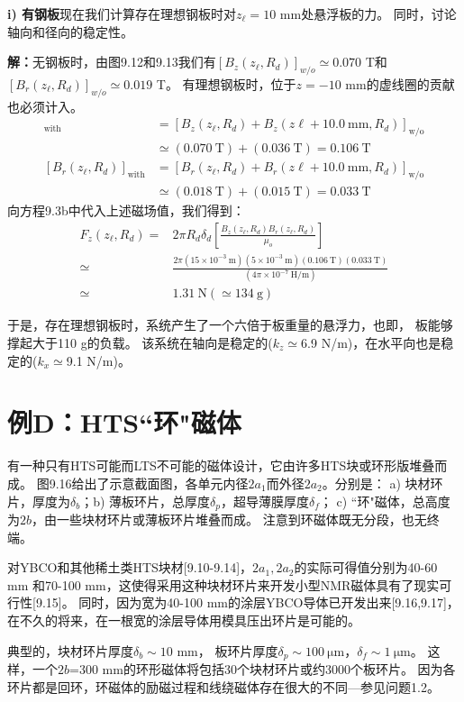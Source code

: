 \textbf{i) 有钢板}\qquad 现在我们计算存在理想钢板时对$z_\ell=10$ mm处悬浮板的力。
同时，讨论轴向和径向的稳定性。

\textbf{解：}无钢板时，由图9.12和9.13我们有$[B_z(z_\ell,R_d)]_{w/o}\simeq 0.070$ T和
$[B_r(z_\ell,R_d)]_{w/o}\simeq 0.019$ T。
有理想钢板时，位于$z=-10$ mm的虚线圈的贡献也必须计入。
\begin{align*}%
[B_z(z_\ell,R_d)]_{\mathrm{with}}&=[B_z(z_\ell,R_d)+B_z(z\ell+10.0\ \mathrm{mm},R_d)]_{\mathrm{w/o}} \\
&\simeq(0.070\ \mathrm{T})+(0.036\ \mathrm{T})=0.106\ \mathrm{T}\\
[B_r(z_\ell,R_d)]_{\mathrm{with}}&=[B_r(z_\ell,R_d)+B_r(z\ell+10.0\ \mathrm{mm},R_d)]_{\mathrm{w/o}} \\
&\simeq(0.018\ \mathrm{T})+(0.015\ \mathrm{T})=0.033\ \mathrm{T}
\end{align*}
向方程9.3b中代入上述磁场值，我们得到：
\begin{align*}%
F_z(z_\ell,R_d)=&2\pi R_d\delta_d\left[\frac{B_z(z_\ell,R_d)B_r(z_\ell,R_d)}{\mu_o}\right]  \\\tag{9.3b}
\simeq&\frac{2\pi(15\times 10^{-3}\ \mathrm{m})(5\times 10^{-3}\ \mathrm{m})(0.106\ \mathrm{T})(0.033\ \mathrm{T})}{(4\pi\times 10^{-7}\ \mathrm{H/m})} \\
\simeq& 1.31\ \mathrm{N}(\simeq 134\ \mathrm{g})
\end{align*}

于是，存在理想钢板时，系统产生了一个六倍于板重量的悬浮力，也即，
板能够撑起大于110 g的负载。
该系统在轴向是稳定的($k_z\simeq$6.9 N/m)，在水平向也是稳定的($k_x\simeq$9.1 N/m)。


\section{例D：HTS``环"磁体}
有一种只有HTS可能而LTS不可能的磁体设计，它由许多HTS块或环形版堆叠而成。
图9.16给出了示意截面图，各单元内径$2a_1$而外径$2a_2$。分别是：
a) 块材环片，厚度为$\delta_b$；b) 薄板环片，总厚度$\delta_p$，超导薄膜厚度$\delta_f$；
c) ``环"磁体，总高度为$2b$，由一些块材环片或薄板环片堆叠而成。
注意到环磁体既无分段，也无终端。

对YBCO和其他稀土类HTS块材[9.10-9.14]，$2a_1,2a_2$的实际可得值分别为40-60 mm
和70-100 mm，这使得采用这种块材环片来开发小型NMR磁体具有了现实可行性[9.15]。
同时，因为宽为40-100 mm的涂层YBCO导体已开发出来[9.16,9.17]，
在不久的将来，在一根宽的涂层导体用模具压出环片是可能的。

典型的，块材环片厚度$\delta_b\sim 10$ mm，
板环片厚度$\delta_p\sim 100\ \mathrm{\mu m}$，$\delta_f\sim 1\ \mathrm{\mu m}$。
这样，一个$2b$=300 mm的环形磁体将包括30个块材环片或约3000个板环片。
因为各环片都是回环，环磁体的励磁过程和线绕磁体存在很大的不同---参见问题1.2。


